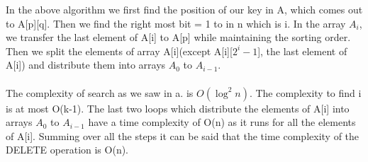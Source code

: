 \documentclass[10pt]{article}
\begin{document}
In the above algorithm we first find the position of our key in A, which comes out to A[p][q]. Then we find the right most bit = 1 to in n which is i. In the array $A_i$, we transfer the last element of A[i] to A[p] while maintaining the sorting order. Then we split the elements of array A[i](except A[i][$2^i-1$], the last element of A[i]) and distribute them into arrays $A_0$ to $A_{i-1}$.\\\\
The complexity of search as we saw in a. is $O(\log^2 n)$. The complexity to find i is at most O(k-1). The last two loops which distribute the elements of A[i] into arrays $A_0$ to $A_{i-1}$ have a time complexity of O(n) as it runs for all the elements of A[i]. Summing over all the steps it can be said that the time complexity of the DELETE operation is O(n).
\end{document}
